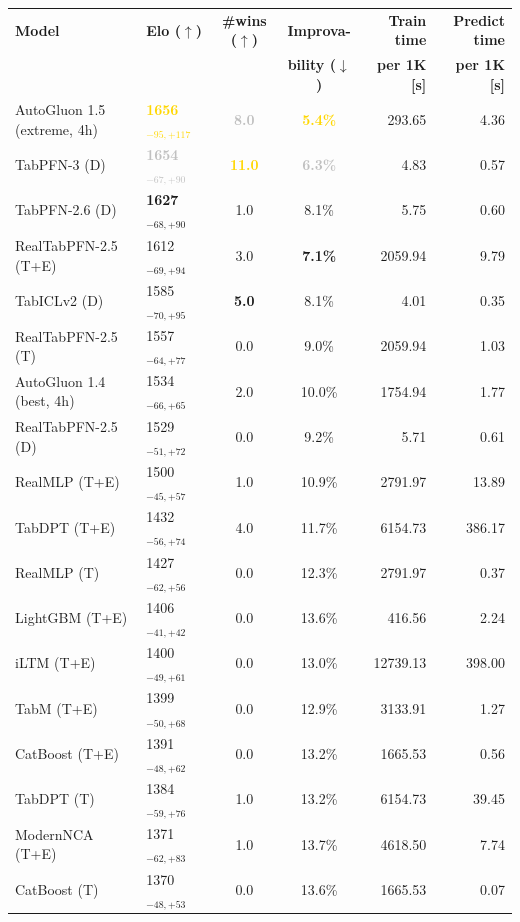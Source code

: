 \begin{tabular}{llccrr}
\toprule
\textbf{Model} & \textbf{Elo ($\uparrow$)} & \textbf{\#wins ($\uparrow$)} & \textbf{Improva-} & \textbf{Train time} & \textbf{Predict time} \\
 &  &  & \textbf{bility ($\downarrow$)} & \textbf{per 1K [s]} & \textbf{per 1K [s]} \\
\midrule
AutoGluon 1.5 (extreme, 4h) & \textcolor{gold}{\textbf{1656${}_{-95,+117}$}} & \textcolor{silver}{\textbf{8.0}} & \textcolor{gold}{\textbf{5.4\%}} & 293.65 & 4.36 \\
TabPFN-3 (D) & \textcolor{silver}{\textbf{1654${}_{-67,+90}$}} & \textcolor{gold}{\textbf{11.0}} & \textcolor{silver}{\textbf{6.3\%}} & 4.83 & 0.57 \\
TabPFN-2.6 (D) & \textcolor{bronze}{\textbf{1627${}_{-68,+90}$}} & 1.0 & 8.1\% & 5.75 & 0.60 \\
RealTabPFN-2.5 (T+E) & 1612${}_{-69,+94}$ & 3.0 & \textcolor{bronze}{\textbf{7.1\%}} & 2059.94 & 9.79 \\
TabICLv2 (D) & 1585${}_{-70,+95}$ & \textcolor{bronze}{\textbf{5.0}} & 8.1\% & 4.01 & 0.35 \\
RealTabPFN-2.5 (T) & 1557${}_{-64,+77}$ & 0.0 & 9.0\% & 2059.94 & 1.03 \\
AutoGluon 1.4 (best, 4h) & 1534${}_{-66,+65}$ & 2.0 & 10.0\% & 1754.94 & 1.77 \\
RealTabPFN-2.5 (D) & 1529${}_{-51,+72}$ & 0.0 & 9.2\% & 5.71 & 0.61 \\
RealMLP (T+E) & 1500${}_{-45,+57}$ & 1.0 & 10.9\% & 2791.97 & 13.89 \\
TabDPT (T+E) & 1432${}_{-56,+74}$ & 4.0 & 11.7\% & 6154.73 & 386.17 \\
RealMLP (T) & 1427${}_{-62,+56}$ & 0.0 & 12.3\% & 2791.97 & 0.37 \\
LightGBM (T+E) & 1406${}_{-41,+42}$ & 0.0 & 13.6\% & 416.56 & 2.24 \\
iLTM (T+E) & 1400${}_{-49,+61}$ & 0.0 & 13.0\% & 12739.13 & 398.00 \\
TabM (T+E) & 1399${}_{-50,+68}$ & 0.0 & 12.9\% & 3133.91 & 1.27 \\
CatBoost (T+E) & 1391${}_{-48,+62}$ & 0.0 & 13.2\% & 1665.53 & 0.56 \\
TabDPT (T) & 1384${}_{-59,+76}$ & 1.0 & 13.2\% & 6154.73 & 39.45 \\
ModernNCA (T+E) & 1371${}_{-62,+83}$ & 1.0 & 13.7\% & 4618.50 & 7.74 \\
CatBoost (T) & 1370${}_{-48,+53}$ & 0.0 & 13.6\% & 1665.53 & 0.07 \\

\end{tabular}
